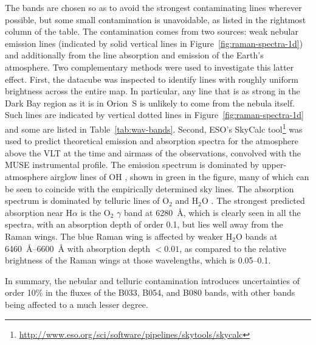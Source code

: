 \documentclass[useAMS, usenatbib, a4paper]{mnras}
\newcommand*\chem[1]{\ensuremath{\mathrm{#1}}}
\newcommand\ha{\ensuremath{\text{H}\alpha}}
\begin{document}
The bands are chosen so as to avoid the strongest contaminating lines
wherever possible, but some small contamination is unavoidable, as
listed in the rightmost column of the table.  The contamination comes
from two sources: weak nebular emission lines (indicated by solid
vertical lines in Figure~\ref{fig:raman-spectra-1d}) and additionally
from the line absorption and emission of the Earth's atmosphere.  Two
complementary methods were used to investigate this latter effect.
First, the datacube was inspected to identify lines with roughly
uniform brightness across the entire map.  In particular, any line
that is as strong in the Dark Bay region as it is in Orion~S is
unlikely to come from the nebula itself.  Such lines are indicated by
vertical dotted lines in Figure~\ref{fig:raman-spectra-1d} and some
are listed in Table~\ref{tab:wav-bands}.  Second, ESO's SkyCalc
tool\footnote{\url{http://www.eso.org/sci/software/pipelines/skytools/skycalc}}
was used to predict theoretical emission and absorption spectra for
the atmosphere above the VLT at the time and airmass of the
observations, convolved with the MUSE instrumental profile.  The
emission spectrum is dominated by upper-atmosphere airglow lines of
\chem{OH} \citep{Osterbrock:1996a, Noll:2012a, Noll:2014a}, shown in
green in the figure, many of which can be seen to coincide with the
empirically determined sky lines.  The absorption spectrum is
dominated by telluric lines of \chem{O_2} and \chem{H_2 O}
\citep{Moehler:2014a, Smette:2015a}.  The strongest predicted
absorption near \ha{} is the \chem{O_2} \(\gamma\) band at
\SI{6280}{\angstrom}, which is clearly seen in all the spectra, with
an absorption depth of order \num{0.1}, but lies well away from the
Raman wings.  The blue Raman wing is affected by weaker \chem{H_2 O}
bands at \SIrange{6460}{6600}{\angstrom} with absorption depth
\(< 0.01\), as compared to the relative brightness of the Raman wings
at those wavelengths, which is \numrange{0.05}{0.1}.

In summary, the nebular and telluric contamination introduces
uncertainties of order 10\% in the fluxes of the B033, B054, and B080
bands, with other bands being affected to a much lesser degree.
\end{document}
